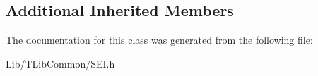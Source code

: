\subsection*{Additional Inherited Members}


The documentation for this class was generated from the following file\+:\begin{DoxyCompactItemize}
\item 
Lib/\+T\+Lib\+Common/S\+E\+I.\+h\end{DoxyCompactItemize}
